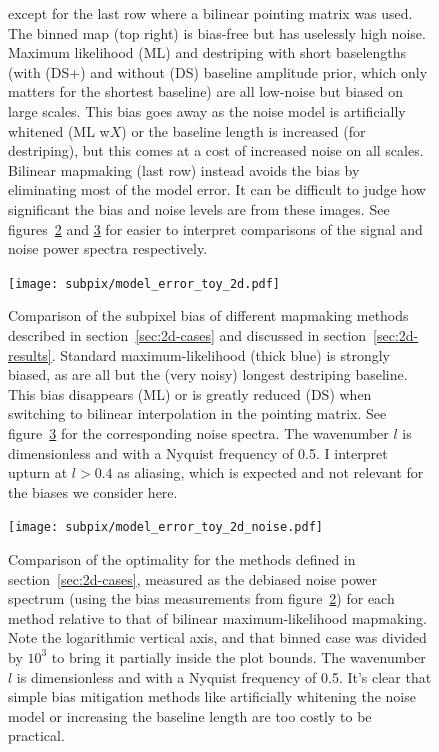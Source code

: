 \documentclass[twocolumn,apj]{aastex63}
\begin{document}
\begin{figure}[p]
{		except for the last row where a bilinear pointing matrix was used.
		The binned map (top right) is bias-free but has uselessly high noise. Maximum likelihood (ML)
		and destriping with short baselengths (with (DS+) and without (DS) baseline amplitude prior,
		which only matters for the shortest baseline)
		are all low-noise but biased on large scales. This bias goes away as the noise model
		is artificially whitened (ML w$X$) or the baseline length is increased (for destriping),
		but this comes at a cost of increased noise on all scales.
		Bilinear mapmaking (last row) instead avoids the bias by eliminating most of the model error.
		It can be difficult to judge how significant the bias and noise levels are from
		these images. See figures~\ref{fig:2d-bias} and \ref{fig:2d-noise} for easier to
		interpret comparisons of the signal and noise power spectra respectively.
	}
	\label{fig:2d-maps}
\end{figure}

\begin{figure}
	\centering
	\hspace*{-5mm}\texttt{[image: subpix/model\_error\_toy\_2d.pdf]}
	\caption{
		Comparison of the subpixel bias of different mapmaking methods
		described in section~\ref{sec:2d-cases} and discussed in section~\ref{sec:2d-results}.
		Standard maximum-likelihood (thick blue) is strongly biased, as are all but
		the (very noisy) longest destriping baseline. This bias disappears (ML)
		or is greatly reduced (DS) when switching to bilinear interpolation in the pointing matrix.
		See figure~\ref{fig:2d-noise} for the corresponding noise spectra.
		The wavenumber $l$ is dimensionless and with a Nyquist frequency of 0.5.
		I interpret upturn at $l>0.4$ as aliasing, which
		is expected and not relevant for the biases we consider here.
	}
	\label{fig:2d-bias}
\end{figure}

\begin{figure}[h!]
	\centering
	\hspace*{-5mm}\texttt{[image: subpix/model\_error\_toy\_2d\_noise.pdf]}
	\caption{
		Comparison of the optimality for the methods defined in section~\ref{sec:2d-cases}, measured
		as the debiased noise power spectrum (using the bias measurements from figure~\ref{fig:2d-bias})
		for each method relative to that of bilinear maximum-likelihood mapmaking.
		Note the logarithmic vertical axis, and that binned case was divided by $10^3$
		to bring it partially inside the plot bounds.
		The wavenumber $l$ is dimensionless and with a Nyquist frequency of 0.5.
		It's clear that simple bias mitigation
		methods like artificially whitening the noise model or increasing the
		baseline length are too costly to be practical.
	}
	\label{fig:2d-noise}
\end{figure}
\end{document}
